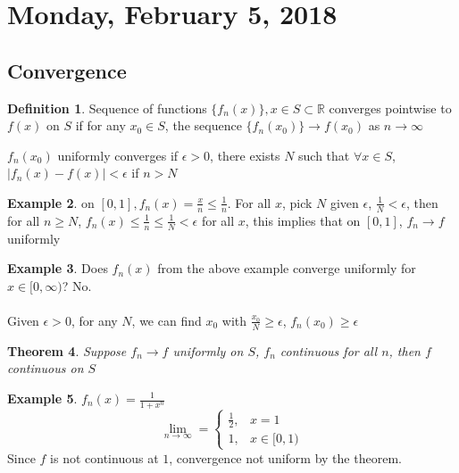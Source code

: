 \documentclass[12pt]{article}
\theoremstyle{plain}
\newtheorem{theorem}{Theorem}[section]
\theoremstyle{definition}
\newtheorem{definition}[theorem]{Definition}
\newtheorem{example}[theorem]{Example}
\begin{document}
\newpage

\section{Monday, February 5, 2018}

\subsection{Convergence}

\begin{definition}
	Sequence of functions $\{ f_n (x) \}, x\in S \subset \mathbb{R}$ converges pointwise to $f(x)$ on $S$ if for any $x_0 \in S$, the sequence $\{ f_n (x_0) \} \to f (x_0)$ as $n \to \infty$
\end{definition}

$f_n (x_0)$ uniformly converges if $\epsilon > 0$, there exists $N$ such that $\forall x \in S$, $|f_n (x) - f(x)| < \epsilon$ if $n > N$

\begin{example}
	on $[0,1], f_n (x) = \frac{x}{n} \leq \frac{1}{n}$. For all $x$, pick $N$ given $\epsilon$, $\frac{1}{N} < \epsilon$, then for all $n \geq N$, $f_n (x) \leq \frac{1}{n} \leq \frac{1}{N} < \epsilon$ for all $x$, this implies that on $[0,1]$, $f_n \to f$ uniformly
\end{example}

\begin{example}
	Does $f_n (x)$ from the above example converge uniformly for $x\in[0,\infty)$? No.\\
	\\
	Given $\epsilon > 0$, for any $N$, we can find $x_0$ with $\frac{x_0}{N} \geq \epsilon$, $f_n (x_0) \geq \epsilon$
\end{example}

\begin{theorem}
	Suppose $f_n \to f$ uniformly on $S$, $f_n$ continuous for all $n$, then $f$ continuous on $S$
\end{theorem}

\begin{example}
	$f_n (x) = \frac{1}{1+x^n}$
	$$\lim_{n\to\infty} = \begin{cases}
		\frac{1}{2}, &x=1\\
		1, &x \in [0,1)
	\end{cases}
$$
Since $f$ is not continuous at $1$, convergence not uniform by the theorem.
\end{example}
\end{document}
